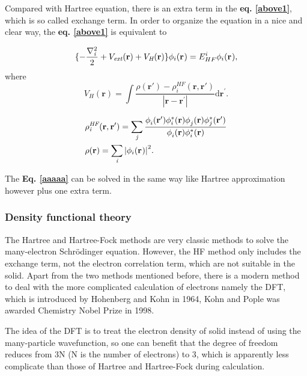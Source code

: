 \documentclass[a4paper, 12pt, titlepage,oneside,drop]{kthesis}
\begin{document}
Compared with Hartree equation, there is an extra term in the \textbf{eq. \ref{above1}}, which is so called exchange term. In order to organize the equation in a nice and clear way, the \textbf{eq. \ref{above1}} is equivalent to

\begin{equation}\label{aaaaa}\begin{split}
\{ -\frac{\nabla^{2}_{\textit i}}{2} + V_\textit{ext}(\textbf{r}) +V_\textit{H}(\textbf{r}) \}  \bwf<i><>  = E^{i}_{HF}   \bwf<i><>, 
\end{split}\end{equation}
where
\begin{equation}
 V_\textit{H}(\textbf{r})= \int \frac{\rho(\textbf{r}{'}) - \rho_{\textit{i}}^{\textit{HF}}(\textbf{r},\textbf{r}{'})}{|\textbf{r} - \textbf{r}^{'} |}  \mathrm{d}\textbf{r}^{'}.
\end{equation}

\begin{equation}
\begin{split}
& \rho_{\textit{i}}^{\textit{HF}}(\textbf{r},\textbf{r}{'}) = \sumi<j> \frac{\phi_{i}^{}(\textbf{r}{'}) \phi_{i}^{*}(\textbf{r}{}) \phi_{j}^{}(\textbf{r}{}) \phi_{j}^{*}(\textbf{r}{'})} {\phi_{i}^{}(\textbf{r}) \phi_{i}^{*}(\textbf{r})}  \\
& \rho(\textbf{r}) = \sumi<i>  {|\bwf<i><>|}^{2}.
\end{split}
\end{equation}

The \textbf{Eq. \ref{aaaaa}} can be solved in the same way like Hartree approximation however plus one extra term.

\subsubsection{Density functional theory}
The Hartree and Hartree-Fock methods are very classic methods to solve the many-electron 
 Schrödinger equation. However, the HF method only includes the exchange term, not the electron correlation term, which are not suitable in the solid.
 Apart from the two methods mentioned before, there is a modern method to deal with
 the more complicated calculation of electrons namely the DFT, which is introduced by Hohenberg and
 Kohn in 1964, Kohn and Pople was awarded Chemistry Nobel Prize in 1998.

The idea of the DFT is to treat the electron density of solid instead of using the many-particle wavefunction, so one can
 benefit that the degree of freedom reduces from 3N (N is the number of electrons) to 3, which is apparently less complicate than 
those of Hartree and Hartree-Fock during calculation. 
\end{document}
